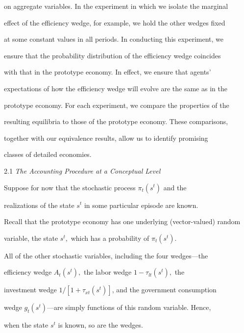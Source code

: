 \documentclass[fleqn,leqno,11pt]{article}
\begin{document}
on aggregate variables. In the experiment in which we isolate the marginal

effect of the efficiency wedge, for example, we hold the other wedges fixed

at some constant values in all periods. In conducting this experiment, we

ensure that the probability distribution of the efficiency wedge coincides

with that in the prototype economy. In effect, we ensure that agents'

expectations of how the efficiency wedge will evolve are the same as in the

prototype economy. For each experiment, we compare the properties of the

resulting equilibria to those of the prototype economy. These comparisons,

together with our equivalence results, allow us to identify promising

classes of detailed economies.



\bigskip



\begin{center}

2.1 \emph{The Accounting Procedure at a Conceptual Level}

\end{center}



Suppose for now that the stochastic process $\pi _{t}(s^{t})$ and the

realizations of the state $s^{t}$ in some particular episode are known.

Recall that the prototype economy has one underlying (vector-valued) random

variable, the state $s^{t},$ which has a probability of $\pi _{t}(s^{t}).$

All of the other stochastic variables, including the four wedges---the

efficiency wedge $A_{t}(s^{t}),$ the labor wedge $1-\tau _{lt}(s^{t}),$ the

investment wedge $1/[1+\tau _{xt}(s^{t})]$, and the government consumption

wedge $g_{t}(s^{t})$---are simply functions of this random variable. Hence,

when the state $s^{t}$ is known, so are the wedges.
\end{document}
